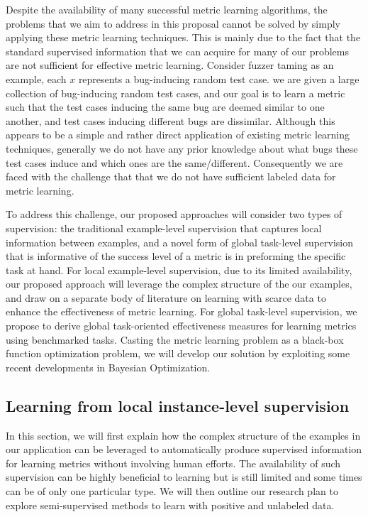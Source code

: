 Despite the availability of many successful metric learning algorithms, the problems that we aim to address in this proposal cannot be solved by simply applying these metric learning techniques. This is mainly due to the fact that the standard supervised information that we can acquire for many of our problems are not sufficient for effective metric learning.  Consider fuzzer taming as an example, each $x$ represents a bug-inducing random test case. we are given a large collection of bug-inducing random test cases, and our goal is to learn a metric such that the test cases inducing the same bug are deemed similar to one another, and test cases inducing different bugs are dissimilar. Although this appears to be a simple and rather direct application of existing metric learning techniques, generally we do not have any prior knowledge about what bugs these test cases induce and which ones are the same/different. Consequently we are faced with the challenge that that we do not have sufficient labeled data for metric learning.

To address this challenge, our proposed approaches will consider two types of supervision: the traditional example-level supervision that captures local information between examples, and a novel form of global task-level supervision that is informative of the success level of a metric is in preforming the specific task at hand.  For local example-level supervision, due to its limited availability, our proposed approach will leverage the complex structure of the our examples, and draw on a separate body of literature on learning with scarce data to enhance the effectiveness of metric learning. For global task-level supervision, we propose to derive global task-oriented effectiveness measures for learning metrics using benchmarked tasks. Casting the metric learning problem as a black-box function optimization problem, we will develop our solution by exploiting some recent developments in Bayesian Optimization.

\subsection{Learning from local instance-level supervision}
In this section, we will first explain how the complex structure of the examples in our application can be leveraged to automatically produce supervised information for learning metrics without involving human efforts.  The availability of such supervision can be highly beneficial to learning but is still limited and some times can be of only one particular type. We will then outline our research plan to explore semi-supervised methods to learn with positive and unlabeled data.

